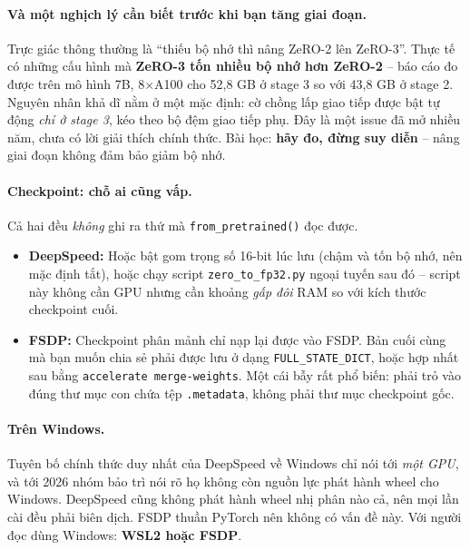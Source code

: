 \paragraph{Và một nghịch lý cần biết trước khi bạn tăng giai đoạn.} Trực giác thông thường là “thiếu bộ nhớ thì nâng ZeRO-2 lên ZeRO-3”. Thực tế có những cấu hình mà \textbf{ZeRO-3 tốn nhiều bộ nhớ hơn ZeRO-2} -- báo cáo đo được trên mô hình 7B, 8$\times$A100 cho 52{,}8 GB ở stage 3 so với 43{,}8 GB ở stage 2. Nguyên nhân khả dĩ nằm ở một mặc định: cờ chồng lấp giao tiếp được bật tự động \emph{chỉ ở stage 3}, kéo theo bộ đệm giao tiếp phụ. Đây là một issue đã mở nhiều năm, chưa có lời giải thích chính thức. Bài học: \textbf{hãy đo, đừng suy diễn} -- nâng giai đoạn không đảm bảo giảm bộ nhớ.

\paragraph{Checkpoint: chỗ ai cũng vấp.} Cả hai đều \emph{không} ghi ra thứ mà \texttt{from\_pretrained()} đọc được.
\begin{itemize}
	\item \textbf{DeepSpeed:} Hoặc bật gom trọng số 16-bit lúc lưu (chậm và tốn bộ nhớ, nên mặc định tắt), hoặc chạy script \texttt{zero\_to\_fp32.py} ngoại tuyến sau đó -- script này không cần GPU nhưng cần khoảng \emph{gấp đôi} RAM so với kích thước checkpoint cuối.
	\item \textbf{FSDP:} Checkpoint phân mảnh chỉ nạp lại được vào FSDP. Bản cuối cùng mà bạn muốn chia sẻ phải được lưu ở dạng \texttt{FULL\_STATE\_DICT}, hoặc hợp nhất sau bằng \texttt{accelerate merge-weights}. Một cái bẫy rất phổ biến: phải trỏ vào đúng thư mục con chứa tệp \texttt{.metadata}, không phải thư mục checkpoint gốc.
\end{itemize}

\paragraph{Trên Windows.} Tuyên bố chính thức duy nhất của DeepSpeed về Windows chỉ nói tới \emph{một GPU}, và tới 2026 nhóm bảo trì nói rõ họ không còn nguồn lực phát hành wheel cho Windows. DeepSpeed cũng không phát hành wheel nhị phân nào cả, nên mọi lần cài đều phải biên dịch. FSDP thuần PyTorch nên không có vấn đề này. Với người đọc dùng Windows: \textbf{WSL2 hoặc FSDP}.

